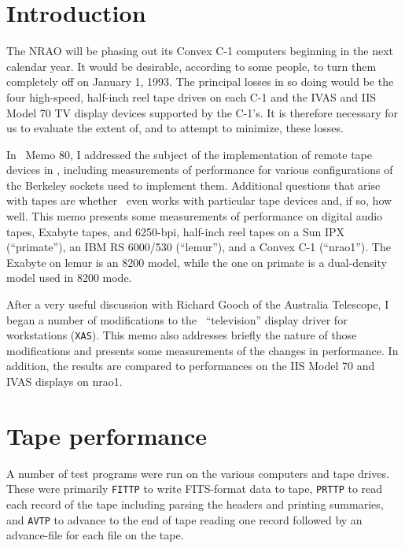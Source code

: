 \title{\memtit}
\vskip -30pt
\maketitle
\vskip -30pt
\normalstyle

\section{Introduction}

The NRAO will be phasing out its Convex C-1 computers beginning in the
next calendar year.  It would be desirable, according to some people,
to turn them completely off on January 1, 1993.  The principal losses
in so doing would be the four high-speed, half-inch reel tape drives
on each C-1 and the IVAS and IIS Model 70 TV display devices supported
by the C-1's.  It is therefore necessary for us to evaluate the extent
of, and to attempt to minimize, these losses.

In \AIPS\ Memo 80, I addressed the subject of the implementation of
remote tape devices in \AIPS, including measurements of performance
for various configurations of the Berkeley sockets used to implement
them.  Additional questions that arise with tapes are whether \AIPS\
even works with particular tape devices and, if so, how well.  This
memo presents some measurements of performance on digital audio tapes,
Exabyte tapes, and 6250-bpi, half-inch reel tapes on a Sun IPX
(``primate''), an IBM RS 6000/530 (``lemur''), and a Convex C-1
(``nrao1'').  The Exabyte on lemur is an 8200 model, while the one on
primate is a dual-density model used in 8200 mode.

After a very useful discussion with Richard Gooch of the Australia
Telescope, I began a number of modifications to the \AIPS\
``television'' display driver for workstations ({\tt XAS}).  This
memo also addresses briefly the nature of those modifications and
presents some measurements of the changes in performance.  In
addition, the results are compared to performances on the IIS Model 70
and IVAS displays on nrao1.

\section{Tape performance}

A number of test programs were run on the various computers and tape
drives.  These were primarily {\tt FITTP} to write FITS-format data to
tape, {\tt PRTTP} to read each record of the tape including parsing
the headers and printing summaries, and {\tt AVTP} to advance to the
end of tape reading one record followed by an advance-file for each
file on the tape.

